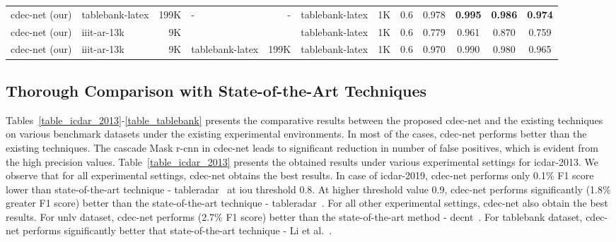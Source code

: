 \documentclass[a4paper,conference]{IEEEtran}
\begin{document}
\begin{table*}[ht!]
\begin{center}
\begin{tabular}{|l| l | r|l |r|l|r| c| c c c c|}
{\sc cd}e{\sc c-n}et (our)  &{\sc t}able{\sc b}ank-{\sc l}a{\sc t}e{\sc x} &199K &- &- &{\sc t}able{\sc b}ank-{\sc l}a{\sc t}e{\sc x} &1K &0.6 &0.978 &\textbf{0.995} &\textbf{0.986} &\textbf{0.974} \\ \hhline{|=|=|=|=|=|=|=|=|====|}
{\sc cd}e{\sc c-n}et (our) &{\sc iiit-ar-13k} &9K & & &{\sc t}able{\sc b}ank-{\sc l}a{\sc t}e{\sc x} &1K &0.6 &0.779 &0.961 &0.870 &0.759 \\  
{\sc cd}e{\sc c-n}et (our) &{\sc iiit-ar-13k} &9K &{\sc t}able{\sc b}ank-{\sc l}a{\sc t}e{\sc x} &199K &{\sc t}able{\sc b}ank-{\sc l}a{\sc t}e{\sc x} &1K &0.6 &0.970 &0.990 &0.980 &0.965 \\ \hline
\end{tabular}
\end{center}
\caption{Illustrates comparison between the proposed {\sc cd}e{\sc c-n}et (our) and state-of-the-art techniques on {\sc t}able{\sc b}ank dataset. {\sc cd}e{\sc c-n}et\textbf{:} indicates a single  model which is trained with {\sc iiit-ar-13k} dataset. \label{table_tablebank}}
\end{table*}

\subsection{Thorough Comparison with State-of-the-Art Techniques}

Tables~\ref{table_icdar_2013}-\ref{table_tablebank} presents the comparative results between the proposed {\sc cd}e{\sc c-n}et and the existing techniques on various benchmark datasets under the existing experimental environments. In most of the cases, {\sc cd}e{\sc c-n}et performs better than the existing techniques. The cascade Mask {\sc r-cnn} in {\sc cd}e{\sc c-n}et leads to significant reduction in number of false positives, which is evident from the high precision values. Table~\ref{table_icdar_2013} presents the obtained results under various experimental settings for {\sc icdar-2013}. We observe that for all experimental settings, {\sc cd}e{\sc c-n}et obtains the best results. In case of {\sc icdar-2019}, {\sc cd}e{\sc c-n}et performs only 0.1\% F1 score lower than state-of-the-art technique - {\sc t}able{\sc r}adar~\cite{gao2019icdar} at {\sc i}o{\sc u} threshold 0.8. At higher threshold value 0.9, {\sc cd}e{\sc c-n}et performs significantly (1.8\% greater F1 score) better than the state-of-the-art technique - {\sc t}able{\sc r}adar~\cite{gao2019icdar}. For all other experimental settings, {\sc cd}e{\sc c-n}et also obtain the best results. For {\sc unlv} dataset, {\sc cd}e{\sc c-n}et performs (2.7\% F1 score) better than the state-of-the-art method - {\sc d}e{\sc cnt}~\cite{siddiqui2018decnt}. For {\sc t}able{\sc b}ank dataset, {\sc cd}e{\sc c-n}et performs significantly  better that state-of-the-art technique - Li et al.~\cite{li2019tablebank}.              
\end{document}
